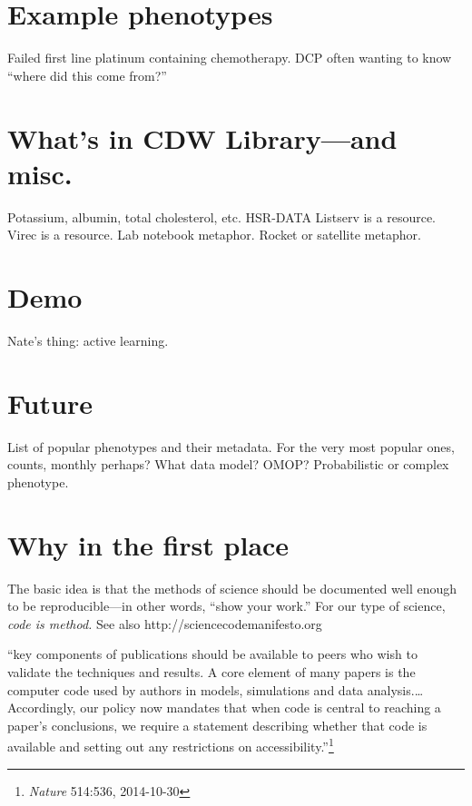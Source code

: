 \documentclass{tufte-handout}
\begin{document}

\section{Example phenotypes}


Failed first line platinum containing chemotherapy. DCP often
wanting to know ``where did this come from?''

\section{What's in CDW Library---and misc.}

Potassium, albumin, total cholesterol, etc. HSR-DATA Listserv is a
resource. Virec is a resource. Lab notebook metaphor. Rocket or
satellite metaphor.

\section{Demo}

Nate's thing: active learning.

\section{Future}

List of popular phenotypes and their metadata. For the very most
popular ones, counts, monthly perhaps? What data model? OMOP?
Probabilistic or complex phenotype. 

\section{Why in the first place}

The basic idea is that the methods of science should be documented
well enough to be reproducible---in other words, ``show your work.''
For our type of science, \emph{code is method.} See also
http://sciencecodemanifesto.org

``key components of publications should be available to peers who wish
to validate the techniques and results. A core element of many papers
is the computer code used by authors in models, simulations and data
analysis.\ldots{} Accordingly, our policy now mandates that when code
is central to reaching a paper's conclusions, we require a statement
describing whether that code is available and setting out any
restrictions on accessibility.''\footnote{\emph{Nature} 514:536,
  2014-10-30}
\end{document}
